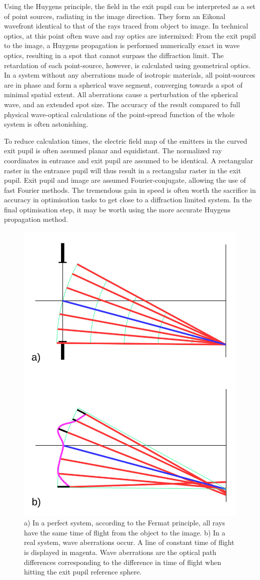 \documentclass[12pt,a4paper,twoside,openright,BCOR10mm,headsepline,titlepage,abstracton,chapterprefix,final]{scrreprt}
\begin{document}
Using the Huygens principle, the field in the exit pupil can be interpreted as a set of point sources, radiating in the image direction. 
They form an Eikonal wavefront identical to that of the rays traced from object to image.
In technical optics, at this point often wave and ray optics are intermixed:
From the exit pupil to the image, a Huygens propagation is performed numerically exact in wave optics, resulting in a spot that cannot surpass the diffraction limit. 
The retardation of each point-source, however, is calculated using geometrical optics.
In a system without any aberrations made of isotropic materials, all point-sources are in phase and form a spherical wave segment, converging towards a spot of minimal spatial extent.
All aberrations cause a perturbation of the spherical wave, and an extended spot size.
The accuracy of the result compared to full physical wave-optical calculations of the point-spread function of the whole system is often astonishing. 

To reduce calculation times, the electric field map of the emitters in the curved exit pupil is often assumed planar and equidistant. 
The normalized ray coordinates in entrance and exit pupil are assumed to be identical.
A rectangular raster in the entrance pupil will thus result in a rectangular raster in the exit pupil.
Exit pupil and image are assumed Fourier-conjugate, allowing the use of fast Fourier methods.
The tremendous gain in speed is often worth the sacrifice in accuracy in optimisation tasks to get close to a diffraction limited system.
In the final optimisation step, it may be worth using the more accurate Huygens propagation method.

\begin{figure}
  \centering
   \includegraphics[width=0.5\columnwidth]{waveaberrations}
  \caption{a) In a perfect system, according to the Fermat principle, all rays have the same time of flight from the object to the image. b) In a real system, wave aberrations occur. A line of constant time of flight is displayed in magenta.
  Wave aberrations are the optical path differences corresponding to the difference in time of flight when hitting the exit pupil reference sphere.}
  \label{fig:waveaberrations}
\end{figure}
\end{document}
